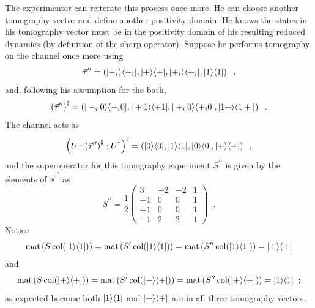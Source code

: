 The experimenter can reiterate this process once more.  He can choose another tomography vector and define another positivity domain.  He knows the states in his tomography vector must be in the positivity domain of his resulting reduced dynamics (by definition of the sharp operator).  Suppose he performs tomography on the channel once more using
$$
\vec{\tau}^{\prime\prime} = \left(|-_i\rangle\langle-_i|,|+\rangle\langle+|,|+_i\rangle\langle+_i|,|1\rangle\langle1|\right)\;\;,
$$
and, following his assumption for the bath,
$$
\left(\vec{\tau}^{\prime\prime}\right)^\sharp = \left(|-_i0\rangle\langle-_i0|,|+1\rangle\langle+1|,|+_i0\rangle\langle+_i0|,|1+\rangle\langle1+|\right)\;\;.
$$
The channel acts as
$$
\left(U:\left(\vec{\tau}^{\prime\prime}\right)^\sharp:U^\dagger\right)^\flat = \left(|0\rangle\langle0|,|1\rangle\langle1|,|0\rangle\langle0|,|+\rangle\langle+|\right)\;\;,
$$
and the superoperator for this tomography experiment $S^{\prime\prime}$ is given by the elements of $\vec{s}^{\;\prime}$ as
$$
S^{\prime\prime} = \frac{1}{2}\begin{pmatrix}
3&-2&-2&1\\
-1&0&0&1\\
-1&0&0&1\\
-1&2&2&1
\end{pmatrix}\;\;.
$$
Notice
\begin{equation}
\label{eqn:notice1}
\operatorname{mat}\left(S\operatorname{col}(|1\rangle\langle1|)\right) = \operatorname{mat}\left(S^\prime\operatorname{col}(|1\rangle\langle1|)\right) = \operatorname{mat}\left(S^{\prime\prime}\operatorname{col}(|1\rangle\langle1|)\right) = |+\rangle\langle+|
\end{equation}
and
\begin{equation}
\label{eqn:notice2}
\operatorname{mat}\left(S\operatorname{col}(|+\rangle\langle+|)\right) = \operatorname{mat}\left(S^\prime\operatorname{col}(|+\rangle\langle+|)\right) = \operatorname{mat}\left(S^{\prime\prime}\operatorname{col}(|+\rangle\langle+|)\right) =|1\rangle\langle1|\;\;;
\end{equation}
as expected because both $|1\rangle\langle1|$ and $|+\rangle\langle+|$ are in all three tomography vectors.

